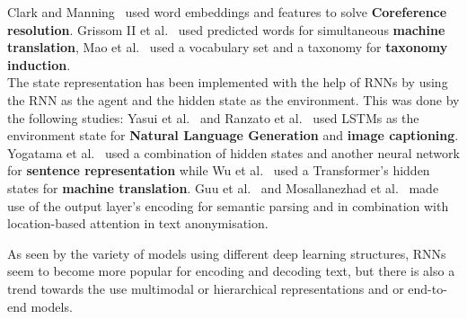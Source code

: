 \documentclass[11pt]{article}
\begin{document}
\begin{itemize}
Clark and Manning~ used word embeddings and features to solve \textbf{Coreference resolution}. Grissom II et al.~ used predicted words for simultaneous \textbf{machine translation}, Mao et al.~ used a vocabulary set and a taxonomy for \textbf{taxonomy induction}.\\
The state representation has been implemented with the help of RNNs by using the RNN as the agent and the hidden state as the environment. This was done by the following studies: Yasui et al.~ and Ranzato et al.~ used LSTMs as the environment state for \textbf{Natural Language Generation} and \textbf{image captioning}. \\ Yogatama et al.~ used a combination of hidden states and another neural network for \textbf{sentence representation} while Wu et al.~ used a Transformer's hidden states for \textbf{machine translation}. Guu et al.~ and Mosallanezhad et al.~ made use of the output layer's encoding for semantic parsing and in combination with location-based attention in text anonymisation.
\end{itemize}

As seen by the variety of models using different deep learning structures, RNNs seem to become more popular for encoding and decoding text, but there is also a trend towards the use multimodal or hierarchical representations and or end-to-end models.
\end{document}
